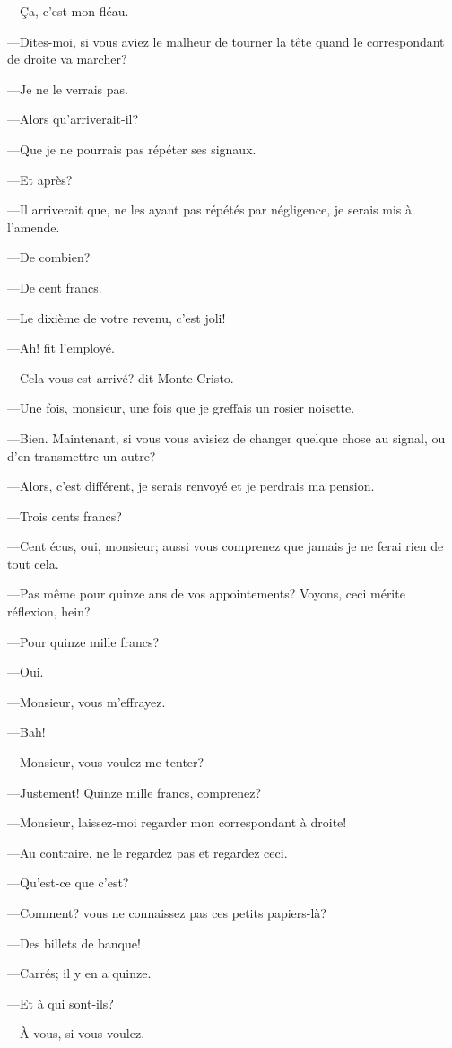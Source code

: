 —Ça, c'est mon fléau. 

—Dites-moi, si vous aviez le malheur de tourner la tête quand le correspondant de droite va marcher? 

—Je ne le verrais pas. 

—Alors qu'arriverait-il? 

—Que je ne pourrais pas répéter ses signaux. 

—Et après? 

—Il arriverait que, ne les ayant pas répétés par négligence, je serais mis à l'amende. 

—De combien? 

—De cent francs. 

—Le dixième de votre revenu, c'est joli! 

—Ah! fit l'employé. 

—Cela vous est arrivé? dit Monte-Cristo. 

—Une fois, monsieur, une fois que je greffais un rosier noisette. 

—Bien. Maintenant, si vous vous avisiez de changer quelque chose au signal, ou d'en transmettre un autre? 

—Alors, c'est différent, je serais renvoyé et je perdrais ma pension. 

—Trois cents francs? 

—Cent écus, oui, monsieur; aussi vous comprenez que jamais je ne ferai rien de tout cela. 

—Pas même pour quinze ans de vos appointements? Voyons, ceci mérite réflexion, hein? 

—Pour quinze mille francs? 

—Oui. 

—Monsieur, vous m'effrayez. 

—Bah! 

—Monsieur, vous voulez me tenter? 

—Justement! Quinze mille francs, comprenez? 

—Monsieur, laissez-moi regarder mon correspondant à droite! 

—Au contraire, ne le regardez pas et regardez ceci. 

—Qu'est-ce que c'est? 

—Comment? vous ne connaissez pas ces petits papiers-là? 

—Des billets de banque! 

—Carrés; il y en a quinze. 

—Et à qui sont-ils? 

—À vous, si vous voulez. 

